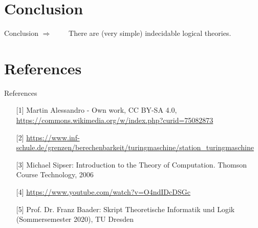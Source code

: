 \documentclass[aspectratio=169]{beamer}
\begin{document}
	\section{Conclusion}
	\begin{frame}{Conclusion}
		$ \Longrightarrow \qquad $ There are (very simple) indecidable logical theories.
		
		\vspace{.3cm}
		
		\vspace{.3cm}
	\end{frame}

	\section{References}
	\begin{frame}{References}
		\begin{itemize}
			\item [{[1]}] Martin Alessandro - Own work, CC BY-SA 4.0, \url{https://commons.wikimedia.org/w/index.php?curid=75082873} \label{ref:automata}
			\item [{[2]}] \url{https://www.inf-schule.de/grenzen/berechenbarkeit/turingmaschine/station_turingmaschine} \label{ref:turing}
			\item [{[3]}] Michael Sipser: Introduction to the Theory of Computation. Thomson Course Technology, 2006
			\item [{[4]}] \url{https://www.youtube.com/watch?v=O4ndIDcDSGc}
			\item [{[5]}] Prof. Dr. Franz Baader: Skript Theoretische Informatik und Logik (Sommersemester 2020), TU Dresden
		\end{itemize}
	\end{frame}
\end{document}
